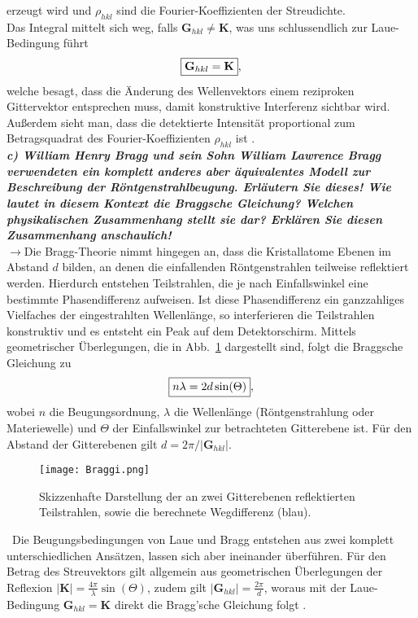 erzeugt wird und $\rho_{hkl}$ sind die Fourier-Koeffizienten der Streudichte. \\
Das Integral mittelt sich weg, falls $\mathbf{G}_{hkl}\neq \mathbf{K}$, was uns schlussendlich zur Laue-Bedingung führt
\begin{equation}
    \fbox{$\mathbf{G}_{hkl} = \mathbf{K}$},
\end{equation}  
welche besagt, dass die Änderung des Wellenvektors einem reziproken Gittervektor entsprechen muss, damit konstruktive Interferenz sichtbar wird. 
Außerdem sieht man, dass die detektierte Intensität proportional zum Betragsquadrat des Fourier-Koeffizienten $\rho_{hkl}$ ist \cite{EPC}. \\

\textbf{\textit{c) William Henry Bragg und sein Sohn William Lawrence Bragg verwendeten
ein komplett anderes aber äquivalentes Modell zur Beschreibung der
Röntgenstrahlbeugung. Erläutern Sie dieses! Wie lautet in diesem Kontext
die Braggsche Gleichung? Welchen physikalischen Zusammenhang
stellt sie dar? Erklären Sie diesen Zusammenhang anschaulich!}}\\
$\rightarrow$Die Bragg-Theorie nimmt hingegen an, dass die Kristallatome Ebenen im Abstand $d$ bilden, an denen die 
einfallenden Röntgenstrahlen teilweise reflektiert werden. Hierdurch entstehen Teilstrahlen, die je nach Einfallswinkel eine
bestimmte Phasendifferenz aufweisen. Ist diese Phasendifferenz ein ganzzahliges Vielfaches der eingestrahlten Wellenlänge, 
so interferieren die Teilstrahlen konstruktiv und es entsteht ein Peak auf dem Detektorschirm. Mittels geometrischer Überlegungen, 
die in Abb.~\ref{fig:bragg} dargestellt sind, folgt die Braggsche Gleichung zu
\begin{equation}\label{eq:bragg}
    \fbox{$n\lambda = 2d\sin(\Theta)$},
\end{equation} 
wobei $n$ die Beugungsordnung, $\lambda$ die Wellenlänge (Röntgenstrahlung oder Materiewelle) und $\Theta$ der Einfallswinkel zur betrachteten 
Gitterebene ist. Für den Abstand der Gitterebenen gilt $d = 2\pi/|\mathbf{G}_{hkl}|$.
\begin{figure}[h!]
    \centering
    \texttt{[image: Braggi.png]}
    \caption{\label{fig:bragg}Skizzenhafte Darstellung der an zwei Gitterebenen reflektierten Teilstrahlen, sowie 
    die berechnete Wegdifferenz (blau).}
\end{figure}\FloatBarrier \,\newpage
Die Beugungsbedingungen von Laue und Bragg entstehen aus zwei komplett unterschiedlichen Ansätzen, lassen sich aber ineinander überführen. 
Für den Betrag des Streuvektors gilt allgemein aus geometrischen Überlegungen der Reflexion $|\mathbf{K}| = \frac{4\pi}{\lambda}\sin(\Theta)$, 
zudem gilt $|\mathbf{G}_{hkl}| = \frac{2\pi}{d}$, woraus mit der Laue-Bedingung $\mathbf{G}_{hkl} = \mathbf{K}$ direkt die 
Bragg'sche Gleichung folgt \cite{EPC}. \\

